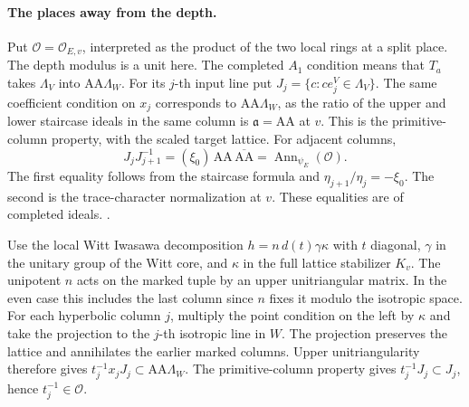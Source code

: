 \paragraph{The places away from the depth.}
Put \(\mathcal O=\mathcal O_{E,v}\), interpreted as
the product of the two local rings at a split place.
The depth modulus is a unit here. The completed
\(A_1\) condition means that \(T_a\) takes \(\Lambda_V\)
into \(\mathrm{AA}\Lambda_W\). For its \(j\)-th input
line put \(J_j=\{c:c e_j^V\in\Lambda_V\}\).
The same coefficient condition on \(x_j\) corresponds
to \(\mathrm{AA}\Lambda_W\), as the ratio of the upper
and lower staircase ideals in the same column is
\(\mathfrak a=\mathrm{AA}\) at \(v\). This is the
primitive-column property, with the scaled target
lattice. For adjacent columns,
\[
 J_j J_{j+1}^{-1}
   =(\xi_0)\,\mathrm{AA}\,\overline{\mathrm{AA}}
   =\operatorname{Ann}_{\psi_E}(\mathcal O).
\]
The first equality follows from the staircase formula
and \(\eta_{j+1}/\eta_j=-\xi_0\). The second is the
trace-character normalization at \(v\). These equalities
are of completed ideals.
.

Use the local Witt Iwasawa decomposition
\(h=n\,d(t)\gamma\kappa\) with \(t\) diagonal,
\(\gamma\) in the unitary group of the Witt core,
and \(\kappa\) in the full lattice stabilizer \(K_v\).
The unipotent \(n\) acts on the marked tuple by an
upper unitriangular matrix. In the even case this includes
the last column since \(n\) fixes it modulo the isotropic
space. For each hyperbolic column \(j\), multiply the
point condition on the left by \(\kappa\) and take
the projection to the \(j\)-th isotropic line in \(W\).
The projection preserves the lattice and annihilates
the earlier marked columns. Upper unitriangularity
therefore gives
\(t_j^{-1}x_j J_j\subset\mathrm{AA}\Lambda_W\).
The primitive-column property gives \(t_j^{-1}J_j
\subset J_j\), hence \(t_j^{-1}\in\mathcal O\).

